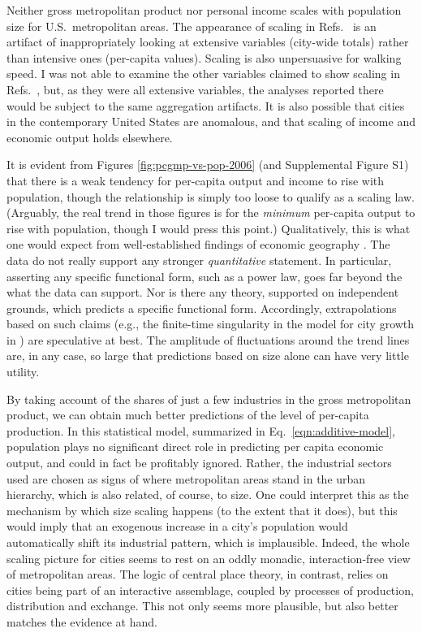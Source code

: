 \documentclass{pnastwo}
\begin{document}
\begin{article}
Neither gross metropolitan product nor personal income scales with population
size for U.S.\ metropolitan areas.  The appearance of scaling in Refs.\
\cite{Bettencout-et-al-growth-innovation-scaling,Bettencourt-et-al-urban-scaling-and-its-deviations}
is an artifact of inappropriately looking at extensive variables (city-wide
totals) rather than intensive ones (per-capita values).  Scaling is also
unpersuasive for walking speed.  I was not able to examine the other variables
claimed to show scaling in Refs.\
\cite{Bettencout-et-al-growth-innovation-scaling,Bettencourt-et-al-urban-scaling-and-its-deviations},
but, as they were all extensive variables, the analyses reported there would be
subject to the same aggregation artifacts.  It is also possible that cities in
the contemporary United States are anomalous, and that scaling of income and
economic output holds elsewhere.

It is evident from Figures \ref{fig:pcgmp-vs-pop-2006} (and Supplemental Figure
S1) that there is a weak tendency for per-capita output and income to rise with
population, though the relationship is simply too loose to qualify as a scaling
law.  (Arguably, the real trend in those figures is for the {\em minimum}
per-capita output to rise with population, though I would press this point.)
Qualitatively, this is what one would expect from well-established findings of
economic geography \cite{Henderson-ZMS-Venables}.  The data do not really
support any stronger {\em quantitative} statement.  In particular, asserting
any specific functional form, such as a power law, goes far beyond the what the
data can support.  Nor is there any theory, supported on independent grounds,
which predicts a specific functional form.  Accordingly, extrapolations based
on such claims (e.g., the finite-time singularity in the model for city growth
in \cite{Bettencout-et-al-growth-innovation-scaling}) are speculative at best.
The amplitude of fluctuations around the trend lines are, in any case, so large
that predictions based on size alone can have very little utility.

By taking account of the shares of just a few industries in the gross
metropolitan product, we can obtain much better predictions of the level of
per-capita production.  In this statistical model, summarized in Eq.\
\ref{eqn:additive-model}, population plays no significant direct role in
predicting per capita economic output, and could in fact be profitably ignored.
Rather, the industrial sectors used are chosen as signs of where metropolitan
areas stand in the urban hierarchy, which is also related, of course, to size.
One could interpret this as the mechanism by which size scaling happens (to the
extent that it does), but this would imply that an exogenous increase in a
city's population would automatically shift its industrial pattern, which is
implausible.  Indeed, the whole scaling picture for cities seems to rest on an
oddly monadic, interaction-free view of metropolitan areas.  The logic of
central place theory, in contrast, relies on cities being part of an
interactive assemblage, coupled by processes of production, distribution and
exchange.  This not only seems more plausible, but also better matches the
evidence at hand.


\end{article}
\end{document}
